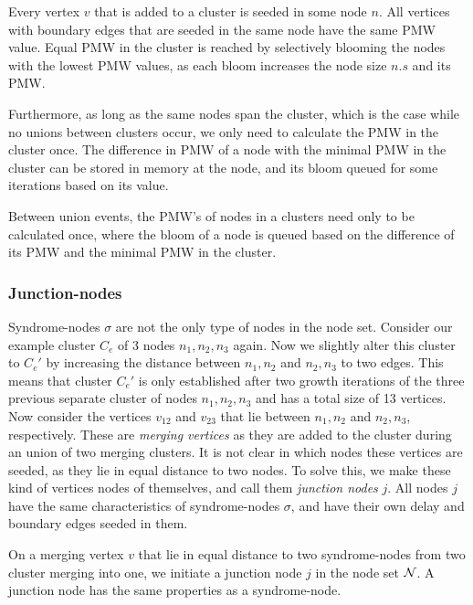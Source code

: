 \begin{theorem}\label{th:balancedbloom}
  Every vertex $v$ that is added to a cluster is seeded in some node $n$. All vertices with boundary edges that are seeded in the same node have the same PMW value. Equal PMW in the cluster is reached by selectively blooming the nodes with the lowest PMW values, as each bloom increases the node size $n.s$ and its PMW.
\end{theorem}

Furthermore, as long as the same nodes span the cluster, which is the case while no unions between clusters occur, we only need to calculate the PMW in the cluster once. The difference in PMW of a node with the minimal PMW in the cluster can be stored in memory at the node, and its bloom queued for some iterations based on its value.

\begin{lemma}\label{lem:calconce}
  Between union events, the PMW's of nodes in a clusters need only to be calculated once, where the bloom of a node is queued based on the difference of its PMW and the minimal PMW in the cluster.
\end{lemma}

\subsubsection{Junction-nodes}

Syndrome-nodes $\sigma$ are not the only type of nodes in the node set. Consider our example cluster $C_e$ of 3 nodes $n_1, n_2, n_3$ again. Now we slightly alter this cluster to $C_e'$ by increasing the distance between $n_1, n_2$ and $n_2, n_3$ to two edges. This means that cluster $C_e'$ is only established after two growth iterations of the three previous separate cluster of nodes $n_1, n_2, n_3$ and has a total size of 13 vertices. Now consider the vertices $v_{12}$ and $v_{23}$ that lie between $n_1, n_2$ and $n_2, n_3$, respectively. These are \emph{merging vertices} as they are added to the cluster during an union of two merging clusters. It is not clear in which nodes these vertices are seeded, as they lie in equal distance to two nodes. To solve this, we make these kind of vertices nodes of themselves, and call them \emph{junction nodes} $j$. All nodes $j$ have the same characteristics of syndrome-nodes $\sigma$, and have their own delay and boundary edges seeded in them.

\begin{lemma}\label{lem:junctionode}
  On a merging vertex $v$ that lie in equal distance to two syndrome-nodes from two cluster merging into one, we initiate a junction node $j$ in the node set $\mathcal{N}$. A junction node has the same properties as a syndrome-node.
\end{lemma}

